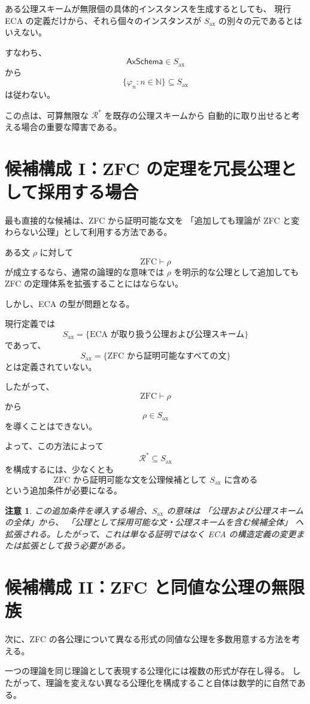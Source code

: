 \documentclass[a4paper,11pt]{jsarticle}
\newtheorem{remark}[definition]{注意}
\newcommand{\Ax}{S_{\mathrm{ax}}}
\begin{document}
ある公理スキームが無限個の具体的インスタンスを生成するとしても、
現行 ECA の定義だけから、それら個々のインスタンスが
$\Ax$ の別々の元であるとはいえない。

すなわち、
\[
\mathsf{AxSchema}\in\Ax
\]
から
\[
\{\varphi_n:n\in\mathbb{N}\}\subseteq\Ax
\]
は従わない。

この点は、可算無限な $\mathcal{R}^{*}$ を既存の公理スキームから
自動的に取り出せると考える場合の重要な障害である。

\section{候補構成 I：ZFC の定理を冗長公理として採用する場合}

最も直接的な候補は、ZFC から証明可能な文を
「追加しても理論が ZFC と変わらない公理」として利用する方法である。

ある文 $\rho$ に対して
\[
\mathrm{ZFC}\vdash\rho
\]
が成立するなら、通常の論理的な意味では
$\rho$ を明示的な公理として追加しても ZFC の定理体系を拡張することにはならない。

しかし、ECA の型が問題となる。

現行定義では
\[
\Ax
=
\{\text{ECA が取り扱う公理および公理スキーム}\}
\]
であって、
\[
\Ax
=
\{\text{ZFC から証明可能なすべての文}\}
\]
とは定義されていない。

したがって、
\[
\mathrm{ZFC}\vdash\rho
\]
から
\[
\rho\in\Ax
\]
を導くことはできない。

よって、この方法によって
\[
\mathcal{R}^{*}\subseteq\Ax
\]
を構成するには、少なくとも
\[
\boxed{
\text{ZFC から証明可能な文を公理候補として $\Ax$ に含める}
}
\]
という追加条件が必要になる。

\begin{remark}
この追加条件を導入する場合、$\Ax$ の意味は
「公理および公理スキームの全体」から、
「公理として採用可能な文・公理スキームを含む候補全体」
へ拡張される。したがって、これは単なる証明ではなく
ECA の構造定義の変更または拡張として扱う必要がある。
\end{remark}

\section{候補構成 II：ZFC と同値な公理の無限族}

次に、ZFC の各公理について異なる形式の同値な公理を多数用意する方法を考える。

一つの理論を同じ理論として表現する公理化には複数の形式が存在し得る。
したがって、理論を変えない異なる公理化を構成すること自体は数学的に自然である。
\end{document}
